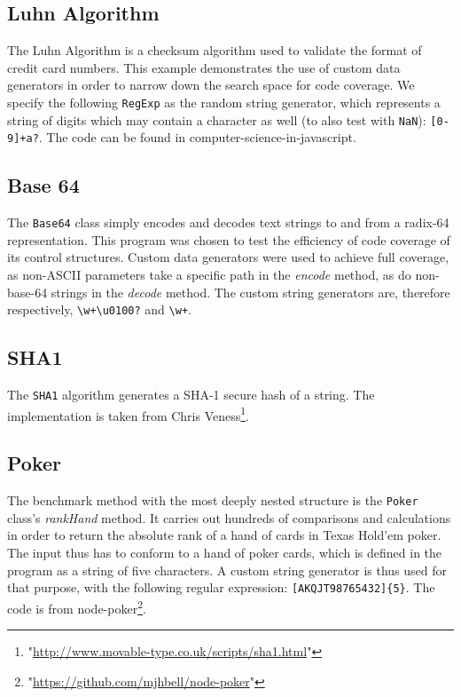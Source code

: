 \subsection{Luhn Algorithm}
The Luhn Algorithm is a checksum algorithm used to validate the format of credit card numbers. This example demonstrates the use of custom data generators in order to narrow down the search space for code coverage. We specify the following \texttt{RegExp} as the random string generator, which represents a string of digits which may contain a character as well (to also test with \texttt{NaN}): \texttt{[0-9]+a?}. The code can be found in \textsf{computer-science-in-javascript}\footnotemark[2].

\subsection{Base 64}
The \texttt{Base64} class simply encodes and decodes text strings to and from a radix-64 representation. This program was chosen to test the efficiency of code coverage of its control structures. Custom data generators were used to achieve full coverage, as non-ASCII parameters take a specific path in the \emph{encode} method, as do non-base-64 strings in the \emph{decode} method. The custom string generators are, therefore respectively, \texttt{\textbackslash w+\textbackslash u0100?} and \texttt{\textbackslash w+}.

\subsection{SHA1}
The \texttt{SHA1} algorithm generates a SHA-1 secure hash of a string. The implementation is taken from Chris Veness\footnote{"\url{http://www.movable-type.co.uk/scripts/sha1.html}"}.

\subsection{Poker}
The benchmark method with the most deeply nested structure is the \texttt{Poker} class's \emph{rankHand} method. It carries out hundreds of comparisons and calculations in order to return the absolute rank of a hand of cards in Texas Hold'em poker. The input thus has to conform to a hand of poker cards, which is defined in the program as a string of five characters. A custom string generator is thus used for that purpose, with the following regular expression: \texttt{[AKQJT98765432]\{5\}}. The code is from \textsf{node-poker}\footnote{"\url{https://github.com/mjhbell/node-poker}"}.

